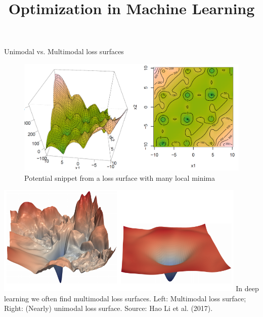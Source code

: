 \documentclass[11pt,compress,t,notes=noshow, xcolor=table]{beamer}
\title{Optimization in Machine Learning}
\date{}
\begin{document}
\sloppy

\begin{vbframe}{Unimodal vs. Multimodal loss surfaces}
\begin{figure}
\centering
\centering
\includegraphics[width=.9\textwidth]{figure_man/multimodal.png}
\footnotesize{Potential snippet from a loss surface with many local minima}
\end{figure}



\includegraphics[width=12cm]{figure_man/difficult_vs_easy.png}
\footnotesize{In deep learning we often find multimodal loss surfaces. Left: Multimodal loss surface; Right: (Nearly) unimodal loss surface. Source: Hao Li et al. (2017). }


\end{vbframe}

\end{document}
